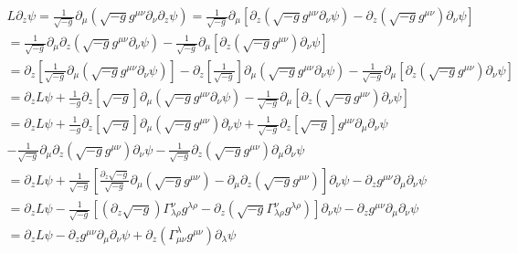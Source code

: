 \documentclass[12pt]{article}
\def\nn{\nonumber}
\begin{document}
\begin{gather}
L\partial_{z}
\psi
=
\frac{1}{\sqrt{- g}}
\partial_{\mu}
(\sqrt{-g} g^{\mu\nu}\partial_{\nu}\partial_{z} \psi)
=
\frac{1}{\sqrt{- g}}
\partial_{\mu}
\left[
\partial_{z}(\sqrt{-g} g^{\mu\nu}\partial_{\nu} \psi)
-
\partial_{z}(\sqrt{-g} g^{\mu\nu}) \partial_{\nu} \psi
\right]
\nn \\
=
\frac{1}{\sqrt{- g}}
\partial_{\mu} \partial_{z}(\sqrt{-g} g^{\mu\nu}\partial_{\nu} \psi)
-
\frac{1}{\sqrt{- g}}
\partial_{\mu} \left[
\partial_{z}(\sqrt{-g} g^{\mu\nu}) \partial_{\nu} \psi\right]
\nn \\
=
\partial_{z}
\left[
\frac{1}{\sqrt{- g}}
\partial_{\mu} (\sqrt{-g} g^{\mu\nu}\partial_{\nu} \psi)
\right]
-
\partial_{z}
\left[
\frac{1}{\sqrt{- g}}
\right]
\partial_{\mu} (\sqrt{-g} g^{\mu\nu}\partial_{\nu} \psi)
-
\frac{1}{\sqrt{- g}}
\partial_{\mu} \left[
\partial_{z}(\sqrt{-g} g^{\mu\nu}) \partial_{\nu} \psi\right]
\nn \\
=
\partial_{z}
L\psi
+
\frac{1}{-g}
\partial_{z}
\left[
\sqrt{- g}
\right]
\partial_{\mu} (\sqrt{-g} g^{\mu\nu}\partial_{\nu} \psi)
-
\frac{1}{\sqrt{- g}}
\partial_{\mu} \left[
\partial_{z}(\sqrt{-g} g^{\mu\nu}) \partial_{\nu} \psi\right]
\nn \\
=
\partial_{z}
L\psi
+
\frac{1}{-g}
\partial_{z}
\left[
\sqrt{- g}
\right]
\partial_{\mu} (\sqrt{-g} g^{\mu\nu}) \partial_{\nu} \psi
+
\frac{1}{\sqrt{-g} }
\partial_{z}
\left[
\sqrt{- g}
\right]
g^{\mu\nu} \partial_{\mu} \partial_{\nu} \psi
\nn \\
-
\frac{1}{\sqrt{- g}}
\partial_{\mu}
\partial_{z}(\sqrt{-g} g^{\mu\nu}) \partial_{\nu} \psi
-
\frac{1}{\sqrt{- g}}
\partial_{z}(\sqrt{-g} g^{\mu\nu}) 
\partial_{\mu} \partial_{\nu} \psi
\nn \\
=
\partial_{z}
L\psi
+
\frac{1}{\sqrt{- g}}
\left[
\frac{\partial_{z}\sqrt{- g}}{\sqrt{-g}}
\partial_{\mu} (\sqrt{-g} g^{\mu\nu})
-
\partial_{\mu}
\partial_{z}(\sqrt{-g} g^{\mu\nu}) 
\right]
\partial_{\nu} \psi
-
\partial_{z} g^{\mu\nu}
\partial_{\mu} \partial_{\nu} \psi
\nn \\
=
\partial_{z}
L\psi
-
\frac{1}{\sqrt{- g}}
\left[
(\partial_{z}\sqrt{- g})
\Gamma^{\nu}_{\lambda \rho}
g^{\lambda \rho}
-
\partial_{z}(\sqrt{- g}\Gamma^{\nu}_{\lambda \rho}
g^{\lambda \rho}) 
\right]
\partial_{\nu} \psi
-
\partial_{z} g^{\mu\nu}
\partial_{\mu} \partial_{\nu} \psi
\nn \\
=
\partial_{z}
L\psi
-
\partial_{z} g^{\mu\nu}
\partial_{\mu} \partial_{\nu} \psi
+
\partial_{z}(\Gamma^{\lambda}_{\mu\nu}
g^{\mu\nu}) 
\partial_{\lambda} \psi
\end{gather}
\end{document}
